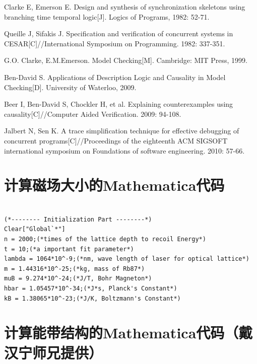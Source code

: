 \documentclass[onecolumn,a4paper,10pt]{article}
\begin{document}
\small
\begin{thebibliography}{99}
\setlength{\itemsep}{0pt}
\setlength{\parskip}{0pt}  %
 Clarke E, Emerson E. Design and synthesis of synchronization skeletons using branching time temporal logic[J]. Logics of Programs, 1982: 52-71.

 Queille J, Sifakis J. Specification and verification of concurrent systems in CESAR[C]//International Symposium on Programming. 1982: 337-351.

G.O. Clarke, E.M.Emerson. Model Checking[M]. Cambridge: MIT Press, 1999.

 Ben-David S. Applications of Description Logic and Causality in Model Checking[D]. University of Waterloo, 2009.

 Beer I, Ben-David S, Chockler H, et al. Explaining counterexamples using causality[C]//Computer Aided Verification. 2009: 94-108.

 Jalbert N, Sen K. A trace simplification technique for effective debugging of concurrent programs[C]//Proceedings of the eighteenth ACM SIGSOFT international symposium on Foundations of software engineering. 2010: 57-66.
\end{thebibliography}




\newpage  %
\begin{appendix}
\renewcommand{\thesection}{附录~\Alph{section}:}   %
\section{计算磁场大小的Mathematica代码}


\begin{verbatim}    

(*-------- Initialization Part --------*)
Clear["Global`*"]
n = 2000;(*times of the lattice depth to recoil Energy*)
t = 10;(*a important fit parameter*)
lambda = 1064*10^-9;(*nm, wave length of laser for optical lattice*)
m = 1.44316*10^-25;(*kg, mass of Rb87*)
muB = 9.274*10^-24;(*J/T, Bohr Magneton*)
hbar = 1.05457*10^-34;(*J*s, Planck's Constant*)
kB = 1.38065*10^-23;(*J/K, Boltzmann's Constant*)

\end{verbatim}

\section{计算能带结构的Mathematica代码（戴汉宁师兄提供）}
\begin{verbatim}

\end{verbatim}
\end{appendix}
\end{document}
